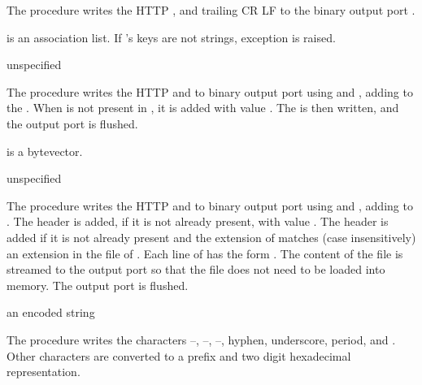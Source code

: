 The  procedure writes the HTTP ,
and trailing CR LF to the binary output port .

 is an association list. If 's keys are not
strings, exception 
is raised.

\begin{procedure}
\end{procedure}
\returns{} unspecified

The  procedure writes the HTTP  and
 to binary output port  using
 and , adding
 to the . When
 is not present in , it is added
with value . The  is then written, and
the output port is flushed.

 is a bytevector.

\begin{procedure}
\end{procedure}
\returns{} unspecified

The  procedure writes the HTTP 
and  to binary output port  using
 and , adding
 to .  The 
header is added, if it is not already present, with value
. The  header is added if
it is not already present and the extension of  matches
(case insensitively) an extension in the  file of
. Each line of  has the form
. The content of
the file is streamed to the output port so that the file does not need
to be loaded into memory. The output port is flushed.

\begin{procedure}
\end{procedure}
\returns{} an encoded string

The  procedure writes the characters
--, --,
--, hyphen, underscore, period, and
\code{\~}. Other characters are converted to a \code{\%} prefix
and two digit hexadecimal representation.

